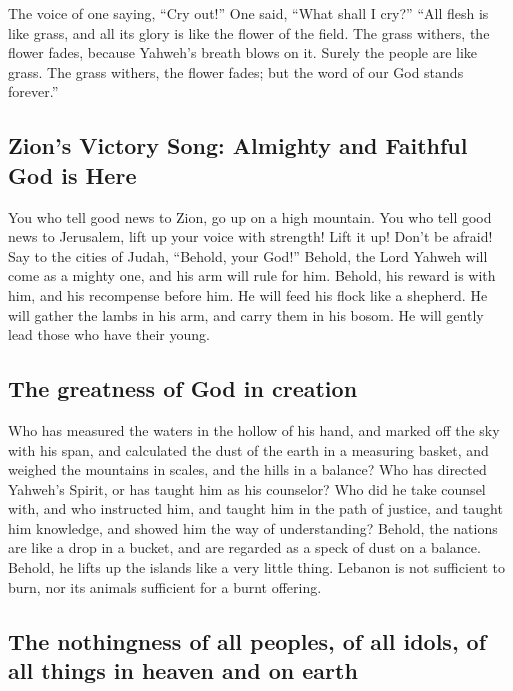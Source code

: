  The voice of one saying, ``Cry out!'' One said, ``What
shall I cry?'' ``All flesh is like grass, and all its glory is like the
flower of the field.  The grass withers, the flower fades,
because Yahweh's breath blows on it. Surely the people are like grass.
 The grass withers, the flower fades; but the word of our
God stands forever.''

\hypertarget{zions-victory-song-almighty-and-faithful-god-is-here}{%
\subsection{Zion's Victory Song: Almighty and Faithful God is
Here}\label{zions-victory-song-almighty-and-faithful-god-is-here}}

 You who tell good news to Zion, go up on a high mountain.
You who tell good news to Jerusalem, lift up your voice with strength!
Lift it up! Don't be afraid! Say to the cities of Judah, ``Behold, your
God!''  Behold, the Lord Yahweh will come as a mighty
one, and his arm will rule for him. Behold, his reward is with him, and
his recompense before him.  He will feed his flock like a
shepherd. He will gather the lambs in his arm, and carry them in his
bosom. He will gently lead those who have their young.

\hypertarget{the-greatness-of-god-in-creation}{%
\subsection{The greatness of God in
creation}\label{the-greatness-of-god-in-creation}}

 Who has measured the waters in the hollow of his hand,
and marked off the sky with his span, and calculated the dust of the
earth in a measuring basket, and weighed the mountains in scales, and
the hills in a balance?  Who has directed Yahweh's
Spirit, or has taught him as his counselor?  Who did he
take counsel with, and who instructed him, and taught him in the path of
justice, and taught him knowledge, and showed him the way of
understanding?  Behold, the nations are like a drop in a
bucket, and are regarded as a speck of dust on a balance. Behold, he
lifts up the islands like a very little thing.  Lebanon
is not sufficient to burn, nor its animals sufficient for a burnt
offering.

\hypertarget{the-nothingness-of-all-peoples-of-all-idols-of-all-things-in-heaven-and-on-earth}{%
\subsection{The nothingness of all peoples, of all idols, of all things
in heaven and on
earth}\label{the-nothingness-of-all-peoples-of-all-idols-of-all-things-in-heaven-and-on-earth}}

